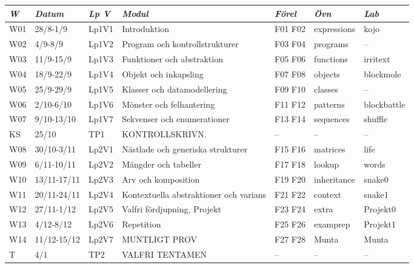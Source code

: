 \begin{tabular}{l|l|l|l|l|l|l}
\textit{W} & \textit{Datum} & \textit{Lp V} & \textit{Modul} & \textit{Förel} & \textit{Övn} & \textit{Lab} \\ \hline \hline
W01 & 28/8-1/9 & Lp1V1 & Introduktion & F01 F02 & expressions & kojo \\
W02 & 4/9-8/9 & Lp1V2 & Program och kontrollstrukturer & F03 F04 & programs & -- \\
W03 & 11/9-15/9 & Lp1V3 & Funktioner och abstraktion & F05 F06 & functions & irritext \\
W04 & 18/9-22/9 & Lp1V4 & Objekt och inkapsling & F07 F08 & objects & blockmole \\
W05 & 25/9-29/9 & Lp1V5 & Klasser och datamodellering & F09 F10 & classes & -- \\
W06 & 2/10-6/10 & Lp1V6 & Mönster och felhantering & F11 F12 & patterns & blockbattle \\
W07 & 9/10-13/10 & Lp1V7 & Sekvenser och enumerationer & F13 F14 & sequences & shuffle \\
KS & 25/10 & TP1 & KONTROLLSKRIVN. & -- & -- & -- \\
W08 & 30/10-3/11 & Lp2V1 & Nästlade och generiska strukturer & F15 F16 & matrices & life \\
W09 & 6/11-10/11 & Lp2V2 & Mängder och tabeller & F17 F18 & lookup & words \\
W10 & 13/11-17/11 & Lp2V3 & Arv och komposition & F19 F20 & inheritance & snake0 \\
W11 & 20/11-24/11 & Lp2V4 & Kontextuella abstraktioner och varians & F21 F22 & context & snake1 \\
W12 & 27/11-1/12 & Lp2V5 & Valfri fördjupning, Projekt & F23 F24 & extra & Projekt0 \\
W13 & 4/12-8/12 & Lp2V6 & Repetition & F25 F26 & examprep & Projekt1 \\
W14 & 11/12-15/12 & Lp2V7 & MUNTLIGT PROV & F27 F28 & Munta & Munta \\
T & 4/1 & TP2 & VALFRI TENTAMEN & -- & -- & -- \\
\end{tabular}
